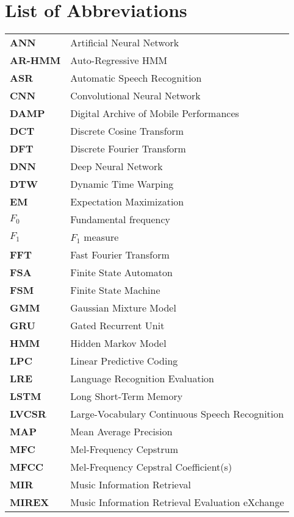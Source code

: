 \cleardoublepage
{}
\chapter*{List of Abbreviations}

\begin{longtable}{p{} p{}}
\textbf{ANN} & Artificial Neural Network\\
\textbf{AR-HMM} & Auto-Regressive HMM\\
\textbf{ASR} & Automatic Speech Recognition\\
\textbf{CNN} & Convolutional Neural Network\\
\textbf{DAMP} & Digital Archive of Mobile Performances\\
\textbf{DCT} & Discrete Cosine Transform\\
\textbf{DFT} & Discrete Fourier Transform\\
\textbf{DNN} & Deep Neural Network\\
\textbf{DTW} & Dynamic Time Warping\\
\textbf{EM} & Expectation Maximization\\
\textbf{$F_0$} & Fundamental frequency\\
\textbf{$F_1$} & $F_1$ measure\\
\textbf{FFT} & Fast Fourier Transform\\
\textbf{FSA} & Finite State Automaton\\
\textbf{FSM} & Finite State Machine\\
\textbf{GMM} & Gaussian Mixture Model\\
\textbf{GRU} & Gated Recurrent Unit\\
\textbf{HMM} & Hidden Markov Model\\
\textbf{LPC} & Linear Predictive Coding\\
\textbf{LRE} & Language Recognition Evaluation\\
\textbf{LSTM} & Long Short-Term Memory\\
\textbf{LVCSR} & Large-Vocabulary Continuous Speech Recognition\\
\textbf{MAP} & Mean Average Precision\\
\textbf{MFC} & Mel-Frequency Cepstrum\\
\textbf{MFCC} & Mel-Frequency Cepstral Coefficient(s)\\
\textbf{MIR} & Music Information Retrieval\\
\textbf{MIREX} & Music Information Retrieval Evaluation eXchange\\

\end{longtable}
